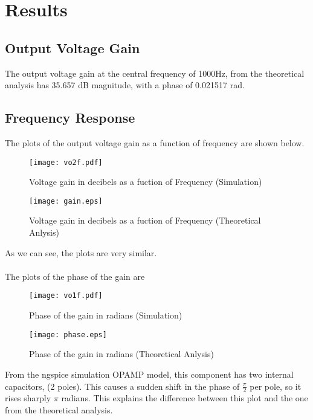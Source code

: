 \section{Results}
\label{sec:res}
\subsection{Output Voltage Gain}
The output voltage gain at the central frequency of 1000Hz, from the theoretical analysis has 35.657 dB magnitude, with a phase of 0.021517 rad.
\subsection{Frequency Response}
The plots of the output voltage gain as a function of frequency are shown below.
\begin{figure}[H] \centering
\texttt{[image: vo2f.pdf]}
\caption{Voltage gain in decibels as a fuction of Frequency (Simulation)}
\label{fig:vos}
\end{figure}

\begin{figure}[H] \centering
\texttt{[image: gain.eps]}
\caption{Voltage gain in decibels as a fuction of Frequency (Theoretical Anlysis)}
\label{fig:vot}
\end{figure}
As we can see, the plots are very similar.\\
\\
The plots of the phase of the gain are
\begin{figure}[H] \centering
\texttt{[image: vo1f.pdf]}
\caption{Phase of the gain in radians (Simulation)}
\label{fig:vov}
\end{figure}

\begin{figure}[H] \centering
\texttt{[image: phase.eps]}
\caption{Phase of the gain in radians (Theoretical Anlysis)}
\label{fig:vow}
\end{figure}

From the ngspice simulation OPAMP model, this component has two internal capacitors, (2 poles). This causes a sudden shift in the phase of $\frac{\pi}{2}$ per pole, so it rises sharply $\pi$ radians. This explains the difference between this plot and the one from the theoretical analysis.

